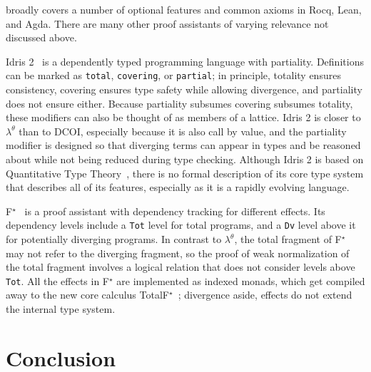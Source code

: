 \documentclass{article}
\newcommand{\code}[1]{\texttt{#1}}
\begin{document}
 broadly covers a number of optional features
and common axioms in Rocq, Lean, and Agda.
There are many other proof assistants of varying relevance not discussed above.

Idris 2~\citep{idris2} is a dependently typed programming language with partiality.
Definitions can be marked as \code{total}, \code{covering}, or \code{partial};
in principle, totality ensures consistency,
covering ensures type safety while allowing divergence,
and partiality does not ensure either.
Because partiality subsumes covering subsumes totality,
these modifiers can also be thought of as members of a lattice.
Idris 2 is closer to $\lambda^\theta$ than to DCOI,
especially because it is also call by value,
and the partiality modifier is designed so that
diverging terms can appear in types and be reasoned about
while not being reduced during type checking.
Although Idris 2 is based on Quantitative Type Theory~\citep{qtt},
there is no formal description of its core type system that describes all of its features,
especially as it is a rapidly evolving language.

F$^\star$~\citep{fstar} is a proof assistant with dependency tracking for different effects.
Its dependency levels include a \code{Tot} level for total programs,
and a \code{Dv} level above it for potentially diverging programs.
In contrast to $\lambda^\theta$,
the total fragment of F$^\star$ may not refer to the diverging fragment,
so the proof of weak normalization of the total fragment
involves a logical relation that does not consider levels above \code{Tot}.
All the effects in F$^\star$ are implemented as indexed monads,
which get compiled away to the new core calculus TotalF$^\star$~\citep{total-fstar};
divergence aside, effects do not extend the internal type system.

\section{Conclusion}

\noindent

\end{document}
